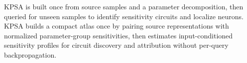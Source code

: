 \documentclass[11pt]{article}
\begin{document}

\begin{publicationhead}
\makepublicationtitle
\end{publicationhead}

  {KPSA is built once from source samples and a parameter decomposition, then queried for unseen samples to identify sensitivity circuits and localize neurons.}
  {KPSA builds a compact atlas once by pairing source representations with normalized parameter-group sensitivities, then estimates input-conditioned sensitivity profiles for circuit discovery and attribution without per-query backpropagation.}
\end{document}
